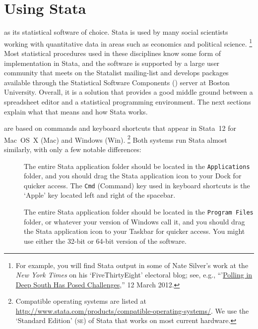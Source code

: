 %
%
\section{Using Stata}%
	\label{sec:stata}%
	
	 as its statistical software of choice. Stata is used by many social scientists working with quantitative data in areas such as economics and political science.%
 	\footnote{For example, you will find Stata output in some of Nate Silver's work at the \emph{New York Times} on his `FiveThirtyEight' electoral blog; see, e.g., ``'\href{http://fivethirtyeight.blogs.nytimes.com/2012/03/12/polling-in-deep-south-has-posed-challenges/}{Polling in Deep South Has Posed Challenges},'' 12 March 2012.} %
	Most statistical procedures used in these disciplines know some form of implementation in Stata, and the software is supported by a large user community that meets on the Statalist mailing-list and develops packages available through the Statistical Software Components (\SSC) server at Boston University. Overall, it is a solution that provides a good middle ground between a spreadsheet editor and a statistical programming environment. The next sections explain what that means and how Stata works.%

 are based on commands and keyboard shortcuts that appear in Stata~12 for Mac~OS~X (Mac) and Windows (Win).%
		\footnote{Compatible operating systems are listed at %
		\url{http://www.stata.com/products/compatible-operating-systems/}. %
		We use the `Standard Edition' (\textsc{se}) of Stata that works on most current hardware.} %
		Both systems run Stata almost similarly, with only a few notable differences:%
		
	\begin{description}

		\item[] %
		The entire Stata application folder should be located in the \texttt{Applications} folder, and you should drag the Stata application icon to your Dock for quicker access. The \texttt{Cmd} (Command) key used in keyboard shortcuts is the `Apple' key located left and right of the spacebar.%

		\item[] %
		The entire Stata application folder should be located in the \texttt{Program Files} folder, or whatever your version of Windows call it, and you should drag the Stata application icon to your Taskbar for quicker access. You might use either the 32-bit or 64-bit version of the software.%

	\end{description}

